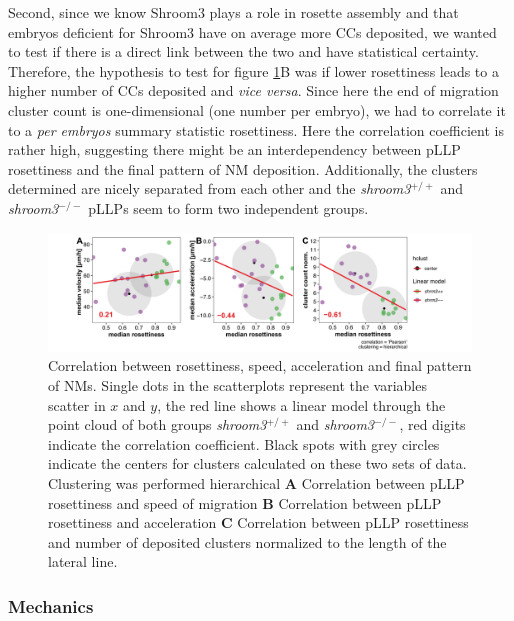 \documentclass[10pt, b5paper, singlespacinge, twoside]{reedthesis} %
\theoremstyle{definition}
\theoremstyle{definition}
\theoremstyle{definition}
\theoremstyle{remark}
\begin{document}
Second, since we know Shroom3 plays a role in rosette assembly and that embryos deficient for Shroom3 have on average more CCs deposited, we wanted to test if there is a direct link between the two and have statistical certainty. Therefore, the hypothesis to test for figure \ref{fig:rdtcorr}B was if lower rosettiness leads to a higher number of CCs deposited and \emph{vice versa}. Since here the end of migration cluster count is one-dimensional (one number per embryo), we had to correlate it to a \emph{per embryos} summary statistic rosettiness. Here the correlation coefficient is rather high, suggesting there might be an interdependency between pLLP rosettiness and the final pattern of NM deposition. Additionally, the clusters determined are nicely separated from each other and the \emph{shroom3}\(^{+/+}\) and \emph{shroom3}\(^{-/-}\) pLLPs seem to form two independent groups.


\begin{figure}[H]

{\centering \includegraphics[width=1\linewidth]{figures/results/03_rosettes/rdt_cor_velo_acc_depo} 

}

\caption[Correlation between rosettiness, speed, acceleration and final pattern of NMs]{Correlation between rosettiness, speed, acceleration and final pattern of NMs. Single dots in the scatterplots represent the variables scatter in \(x\) and \(y\), the red line shows a linear model through the point cloud of both groups \emph{shroom3}\(^{+/+}\) and \emph{shroom3}\(^{-/-}\), red digits indicate the correlation coefficient. Black spots with grey circles indicate the centers for clusters calculated on these two sets of data. Clustering was performed hierarchical \textbf{A} Correlation between pLLP rosettiness and speed of migration \textbf{B} Correlation between pLLP rosettiness and acceleration \textbf{C} Correlation between pLLP rosettiness and number of deposited clusters normalized to the length of the lateral line.}\label{fig:rdtcorr}
\end{figure}
\hypertarget{res-rockresc}{%
\subsubsection{Mechanics}\label{res-rockresc}}
\end{document}
